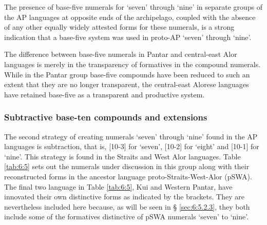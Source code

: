 The presence of base-five numerals for `seven' through `nine' in separate groups of the AP languages at opposite ends of the archipelago, coupled with the absence of any other equally widely attested forms for these numerals, is a strong indication that a base-five system was used in proto-AP `seven' through `nine'. 

The difference between base-five numerals in Pantar and central-east Alor languages is merely in the transparency of formatives in the compound numerals. While in the Pantar group base-five compounds have been reduced to such an extent that they are no longer transparent, the central-east Alorese languages have retained base-five as a transparent and productive system. 

\subsubsection{Subtractive base-ten compounds and extensions}\label{sec:6:5.2.2}
The second strategy of creating numerals `seven' through `nine' found in the AP languages is subtraction, that is, [10-3] for `seven', [10-2] for `eight' and  [10-1] for `nine'. This strategy is found in the Straits and West Alor languages. Table \ref{tab:6:5} sets out the numerals under discussion in this group along with their reconstructed forms in the ancestor language proto-Straits-West-Alor (pSWA). The final two language in Table \ref{tab:6:5}, Kui and Western Pantar, have innovated their own distinctive forms as indicated by the brackets. They are nevertheless included here because, as will be seen in {\S} \ref{sec:6:5.2.3}, they both include some of the formatives distinctive of pSWA numerals `seven' to `nine'.



